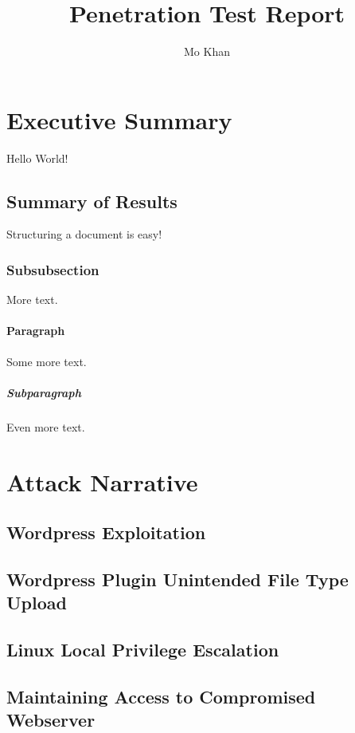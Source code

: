 \documentclass{article}
\title{Penetration Test Report}
\author{Mo Khan}
\begin{document}
\maketitle
\newpage
\tableofcontents
\newpage
{}

\section{Executive Summary}

Hello World!

\subsection{Summary of Results}

Structuring a document is easy!

\subsubsection{Subsubsection}

More text.

\paragraph{Paragraph}

Some more text.

\subparagraph{Subparagraph}

Even more text.

\newpage
\section{Attack Narrative}
\subsection{Wordpress Exploitation}
\subsection{Wordpress Plugin Unintended File Type Upload}
\subsection{Linux Local Privilege Escalation}
\subsection{Maintaining Access to Compromised Webserver}
\end{document}
